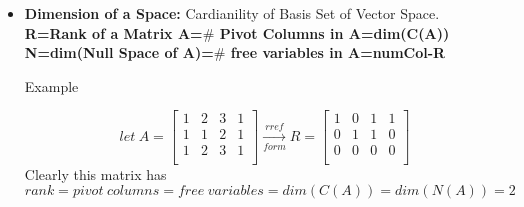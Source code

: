 \documentclass[a4paper,11pt]{article}
\numberwithin{equation}{section}
\begin{document}
\begin{itemize}
\item \textbf{Dimension of a Space: }Cardianility of Basis Set of Vector Space.\\

\textbf{R=Rank of a Matrix A=$\#$ Pivot Columns in A=dim(C(A))}\\
\textbf{N=dim(Null Space of A)=$\#$ free variables in A=numCol-R}

Example
\begin{center}
    \[ let \hspace{3pt} A=
        \begin{bmatrix}
            1&2&3&1\\1&1&2&1\\1&2&3&1\\
        \end{bmatrix} \xrightarrow[form]{rref}
        R=
        \begin{bmatrix}
            1&0&1&1\\
            0&1&1&0\\
            0&0&0&0\\
        \end{bmatrix}
    \]
    Clearly this matrix has $rank=pivot\hspace{3pt} columns=free\hspace{3pt} variables=dim(C(A))=dim(N(A))=2$
\end{center}


\end{itemize}
\end{document}
